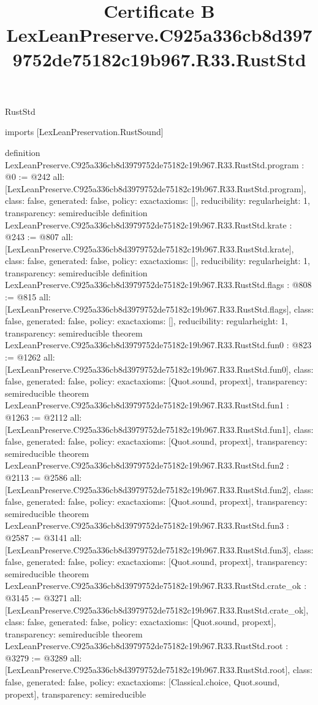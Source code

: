 \begin{lexlean}{RustStd}
\title{Certificate B LexLeanPreserve.C925a336cb8d3979752de75182c19b967.R33.RustStd}
\begin{coremodule}
imports [LexLeanPreservation.RustSound]

definition LexLeanPreserve.C925a336cb8d3979752de75182c19b967.R33.RustStd.program : @0 := @242 {
  all: [LexLeanPreserve.C925a336cb8d3979752de75182c19b967.R33.RustStd.program],
  class: false,
  generated: false,
  policy: exact{axioms: []},
  reducibility: regular{height: 1},
  transparency: semireducible
}
definition LexLeanPreserve.C925a336cb8d3979752de75182c19b967.R33.RustStd.krate : @243 := @807 {
  all: [LexLeanPreserve.C925a336cb8d3979752de75182c19b967.R33.RustStd.krate],
  class: false,
  generated: false,
  policy: exact{axioms: []},
  reducibility: regular{height: 1},
  transparency: semireducible
}
definition LexLeanPreserve.C925a336cb8d3979752de75182c19b967.R33.RustStd.flags : @808 := @815 {
  all: [LexLeanPreserve.C925a336cb8d3979752de75182c19b967.R33.RustStd.flags],
  class: false,
  generated: false,
  policy: exact{axioms: []},
  reducibility: regular{height: 1},
  transparency: semireducible
}
theorem LexLeanPreserve.C925a336cb8d3979752de75182c19b967.R33.RustStd.fun0 : @823 := @1262 {
  all: [LexLeanPreserve.C925a336cb8d3979752de75182c19b967.R33.RustStd.fun0],
  class: false,
  generated: false,
  policy: exact{axioms: [Quot.sound, propext]},
  transparency: semireducible
}
theorem LexLeanPreserve.C925a336cb8d3979752de75182c19b967.R33.RustStd.fun1 : @1263 := @2112 {
  all: [LexLeanPreserve.C925a336cb8d3979752de75182c19b967.R33.RustStd.fun1],
  class: false,
  generated: false,
  policy: exact{axioms: [Quot.sound, propext]},
  transparency: semireducible
}
theorem LexLeanPreserve.C925a336cb8d3979752de75182c19b967.R33.RustStd.fun2 : @2113 := @2586 {
  all: [LexLeanPreserve.C925a336cb8d3979752de75182c19b967.R33.RustStd.fun2],
  class: false,
  generated: false,
  policy: exact{axioms: [Quot.sound, propext]},
  transparency: semireducible
}
theorem LexLeanPreserve.C925a336cb8d3979752de75182c19b967.R33.RustStd.fun3 : @2587 := @3141 {
  all: [LexLeanPreserve.C925a336cb8d3979752de75182c19b967.R33.RustStd.fun3],
  class: false,
  generated: false,
  policy: exact{axioms: [Quot.sound, propext]},
  transparency: semireducible
}
theorem LexLeanPreserve.C925a336cb8d3979752de75182c19b967.R33.RustStd.crate_ok : @3145 := @3271 {
  all: [LexLeanPreserve.C925a336cb8d3979752de75182c19b967.R33.RustStd.crate_ok],
  class: false,
  generated: false,
  policy: exact{axioms: [Quot.sound, propext]},
  transparency: semireducible
}
theorem LexLeanPreserve.C925a336cb8d3979752de75182c19b967.R33.RustStd.root : @3279 := @3289 {
  all: [LexLeanPreserve.C925a336cb8d3979752de75182c19b967.R33.RustStd.root],
  class: false,
  generated: false,
  policy: exact{axioms: [Classical.choice, Quot.sound, propext]},
  transparency: semireducible
}


\end{coremodule}
\end{lexlean}
